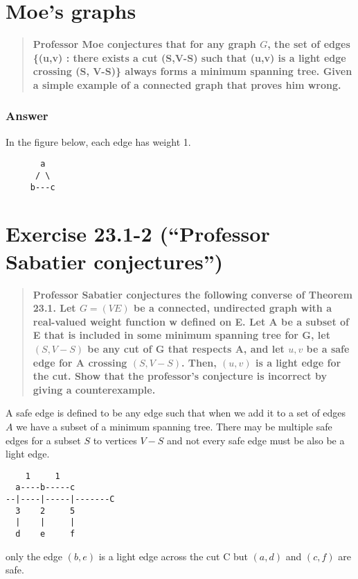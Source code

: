 \documentclass[titlepage]{article}\usepackage[]{graphicx}\usepackage[]{color}
\begin{document}
  



\section{Moe's graphs}
  \begin{quote}
    \textbf{Professor Moe conjectures that for any graph $G$, the set of
  edges \{(u,v) : there exists a cut (S,V-S) such that (u,v) is a light
  edge crossing (S, V-S)\} always forms a minimum spanning tree.  Given
  a simple example of a connected graph that proves him wrong.}
  \end{quote}
  \subsubsection{Answer}
  In the figure below, each edge has weight 1.
  \begin{verbatim}
       a
      / \
     b---c
  \end{verbatim}

\section{ Exercise 23.1-2 (``Professor Sabatier conjectures'')}
\begin{quote}
  \textbf{Professor Sabatier conjectures the following converse of Theorem
  23.1. Let $G = (V E)$  be a connected, undirected graph with a real-valued weight function w
defined on E. Let A be a subset of E that is included in some minimum spanning
tree for G, let $(S, V- S)$ be any cut of G that respects A, and let $u,v$ be a
safe edge for A crossing $(S, V-S)$. Then, $(u,v)$ is a light edge for the cut. Show
that the professor’s conjecture is incorrect by giving a counterexample.}
\end{quote}

A safe edge is defined to be any edge such that when we add it to a set of
edges $A$ we have a subset of a minimum spanning tree. There may be multiple
safe edges for a subset $S$ to vertices $V-S$ and not every safe edge must be
also be a light edge. 

\begin{verbatim}
    1     1
  a----b-----c
--|----|-----|-------C
  3    2     5
  |    |     |
  d	   e     f
\end{verbatim}

  only the edge $(b,e)$ is a light edge across the cut C but $(a,d)$ and
  $(c,f)$ are safe. 
\end{document}
